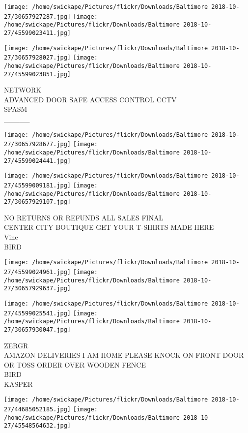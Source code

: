 \documentclass[10pt,letterpaper]{article}
\begin{document}
\texttt{[image: /home/swickape/Pictures/flickr/Downloads/Baltimore 2018-10-27/30657927287.jpg]}
\texttt{[image: /home/swickape/Pictures/flickr/Downloads/Baltimore 2018-10-27/45599023411.jpg]}

\texttt{[image: /home/swickape/Pictures/flickr/Downloads/Baltimore 2018-10-27/30657928027.jpg]}
\texttt{[image: /home/swickape/Pictures/flickr/Downloads/Baltimore 2018-10-27/45599023851.jpg]}

NETWORK\\
ADVANCED DOOR SAFE ACCESS CONTROL CCTV\\
SPASM\\
\_\_\_\_\_
\pagebreak

\texttt{[image: /home/swickape/Pictures/flickr/Downloads/Baltimore 2018-10-27/30657928677.jpg]}
\texttt{[image: /home/swickape/Pictures/flickr/Downloads/Baltimore 2018-10-27/45599024441.jpg]}

\texttt{[image: /home/swickape/Pictures/flickr/Downloads/Baltimore 2018-10-27/45599009181.jpg]}
\texttt{[image: /home/swickape/Pictures/flickr/Downloads/Baltimore 2018-10-27/30657929107.jpg]}

NO RETURNS OR REFUNDS ALL SALES FINAL\\
CENTER CITY BOUTIQUE GET YOUR T{-}SHIRTS MADE HERE\\
Vine\\
BIRD
\pagebreak

\texttt{[image: /home/swickape/Pictures/flickr/Downloads/Baltimore 2018-10-27/45599024961.jpg]}
\texttt{[image: /home/swickape/Pictures/flickr/Downloads/Baltimore 2018-10-27/30657929637.jpg]}

\texttt{[image: /home/swickape/Pictures/flickr/Downloads/Baltimore 2018-10-27/45599025541.jpg]}
\texttt{[image: /home/swickape/Pictures/flickr/Downloads/Baltimore 2018-10-27/30657930047.jpg]}

ZERGR\\
AMAZON DELIVERIES I AM HOME PLEASE KNOCK ON FRONT DOOR OR TOSS ORDER OVER WOODEN FENCE\\
BIRD\\
KASPER
\pagebreak

\texttt{[image: /home/swickape/Pictures/flickr/Downloads/Baltimore 2018-10-27/44685052185.jpg]}
\texttt{[image: /home/swickape/Pictures/flickr/Downloads/Baltimore 2018-10-27/45548564632.jpg]}
\end{document}
